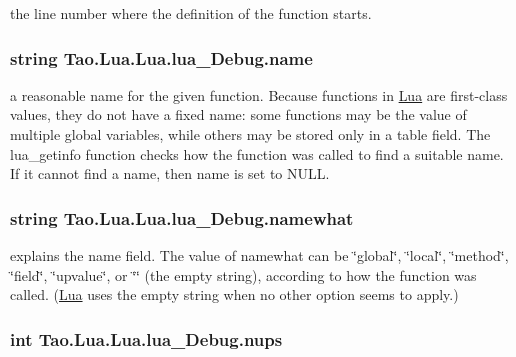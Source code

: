 the line number where the definition of the function starts. 

\hypertarget{struct_tao_1_1_lua_1_1_lua_1_1lua___debug_a9ef8232e37059b3726de4bb119892b12}{
\subsubsection[{name}]{\setlength{\rightskip}{0pt plus 5cm}string {\bf Tao.Lua.Lua.lua\_\-Debug.name}}}
\label{struct_tao_1_1_lua_1_1_lua_1_1lua___debug_a9ef8232e37059b3726de4bb119892b12}


a reasonable name for the given function. Because functions in \hyperlink{namespace_tao_1_1_lua}{Lua} are first-\/class values, they do not have a fixed name: some functions may be the value of multiple global variables, while others may be stored only in a table field. The lua\_\-getinfo function checks how the function was called to find a suitable name. If it cannot find a name, then name is set to NULL. 

\hypertarget{struct_tao_1_1_lua_1_1_lua_1_1lua___debug_ad3d4677c0ea662d4c9b74e19b4a167e3}{
\subsubsection[{namewhat}]{\setlength{\rightskip}{0pt plus 5cm}string {\bf Tao.Lua.Lua.lua\_\-Debug.namewhat}}}
\label{struct_tao_1_1_lua_1_1_lua_1_1lua___debug_ad3d4677c0ea662d4c9b74e19b4a167e3}


explains the name field. The value of namewhat can be \char`\"{}global\char`\"{}, \char`\"{}local\char`\"{}, \char`\"{}method\char`\"{}, \char`\"{}field\char`\"{}, \char`\"{}upvalue\char`\"{}, or \char`\"{}\char`\"{} (the empty string), according to how the function was called. (\hyperlink{namespace_tao_1_1_lua}{Lua} uses the empty string when no other option seems to apply.) 

\hypertarget{struct_tao_1_1_lua_1_1_lua_1_1lua___debug_a96ed9eeddaa6374472d97c1fe95a081d}{
\subsubsection[{nups}]{\setlength{\rightskip}{0pt plus 5cm}int {\bf Tao.Lua.Lua.lua\_\-Debug.nups}}}
\label{struct_tao_1_1_lua_1_1_lua_1_1lua___debug_a96ed9eeddaa6374472d97c1fe95a081d}


